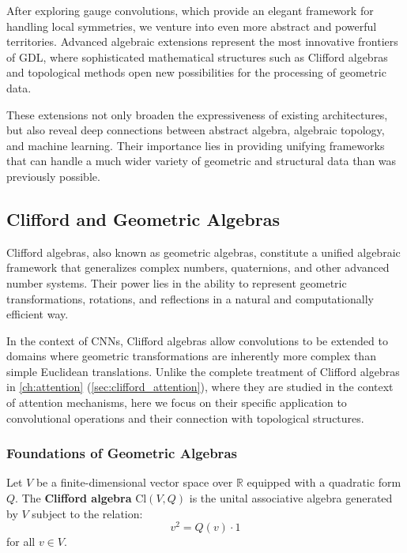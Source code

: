 After exploring gauge convolutions, which provide an elegant framework for handling local symmetries, we venture into even more abstract and powerful territories. Advanced algebraic extensions represent the most innovative frontiers of \gls{GDL}, where sophisticated mathematical structures such as Clifford algebras and topological methods open new possibilities for the processing of geometric data.

These extensions not only broaden the expressiveness of existing architectures, but also reveal deep connections between abstract algebra, algebraic topology, and machine learning. Their importance lies in providing unifying frameworks that can handle a much wider variety of geometric and structural data than was previously possible.

\subsection{Clifford and Geometric Algebras}

Clifford algebras, also known as geometric algebras, constitute a unified algebraic framework that generalizes complex numbers, quaternions, and other advanced number systems. Their power lies in the ability to represent geometric transformations, rotations, and reflections in a natural and computationally efficient way.

In the context of CNNs, Clifford algebras allow convolutions to be extended to domains where geometric transformations are inherently more complex than simple Euclidean translations. Unlike the complete treatment of Clifford algebras in \autoref{ch:attention} (\autoref{sec:clifford_attention}), where they are studied in the context of attention mechanisms, here we focus on their specific application to convolutional operations and their connection with topological structures.

\subsubsection{Foundations of Geometric Algebras}

\begin{definition}\label{def:clifford_cnn}
Let $V$ be a finite-dimensional vector space over $\mathbb{R}$ equipped with a quadratic form $Q$. The \textbf{Clifford algebra} $\text{Cl}(V,Q)$ is the unital associative algebra generated by $V$ subject to the relation:
\[v^2 = Q(v) \cdot 1\]
for all $v \in V$.
\end{definition}

